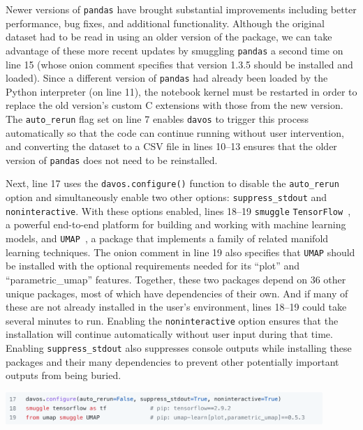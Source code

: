 \documentclass[preprint,12pt,a4paper]{elsarticle}
\begin{document}
Newer versions of \texttt{pandas} have brought substantial
improvements including better performance, bug fixes, and additional functionality.
Although the original dataset had to be read in using an older version
of the package, we can take advantage of these more recent updates 
by smuggling \texttt{pandas} a second time on line 15 (whose onion comment
specifies that version 1.3.5 should be installed and loaded).  Since
a different version of \texttt{pandas} had already been loaded by the Python interpreter
(on line 11), the notebook kernel must be restarted in order to replace the old 
version's custom C extensions with those from the new version.  The \texttt{auto\_rerun} flag
set on line 7 enables \texttt{davos} to trigger this process automatically so that
the code can continue running without user intervention, and converting
the dataset to a CSV file in lines 10--13 ensures that
the older version of \texttt{pandas} does not need to be reinstalled.

Next, line 17 uses the \texttt{davos.configure()} function to disable
the \texttt{auto\_rerun} option and simultaneously enable two other
options: \texttt{suppress\_stdout} and \texttt{noninteractive}. With
these options enabled, lines 18--19 \texttt{smuggle}
\texttt{TensorFlow}~\cite{AbadEtal15}, a powerful end-to-end platform
for building and working with machine learning models, and
\texttt{UMAP}~\cite{McInEtal18b}, a package that implements a family
of related manifold learning techniques. The onion comment in line 19
also specifies that \texttt{UMAP} should be installed with the
optional requirements needed for its ``plot'' and ``parametric\_umap''
features. Together, these two packages depend on 36 other unique
packages, most of which have dependencies of their own. And if many of
these are not already installed in the user's environment, lines
18--19 could take several minutes to run.  Enabling the
\texttt{noninteractive} option ensures that the installation will
continue automatically without user input during that time.  Enabling
\texttt{suppress\_stdout} also suppresses console outputs while installing 
these packages and their many dependencies to prevent other potentially important outputs from being buried.
\begin{center}
\includegraphics[width=0.9\textwidth]{figs/example4}
\end{center}
\end{document}
